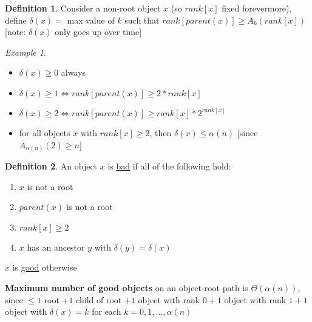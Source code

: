 \documentclass[a4paper,12pt]{article}
\theoremstyle{plain}
\theoremstyle{definition}
\newtheorem*{definition}{Definition}
\theoremstyle{remark}
\newtheorem*{example}{Example}
\begin{document}
\begin{definition}
Consider a non-root object $x$ (so $rank[x]$ fixed forevermore), define $\delta(x) =$ max value of $k$ such that $rank[parent(x)] \geq A_k(rank[x])$ [note: $\delta(x)$ only goes up over time]
\end{definition}

\begin{example}
\begin{itemize}
	\item $\delta(x) \geq 0$ always
	\item $\delta(x) \geq 1 \iff rank[parent(x)] \geq 2 * rank[x]$
	\item $\delta(x) \geq 2 \iff rank[parent(x)] \geq rank[x] * 2^{rank[x]}$
	\item for all objects $x$ with $rank[x] \geq 2$, then $\delta(x) \leq \alpha(n)$ [since $A_{\alpha(n)}(2) \geq n$]
\end{itemize}
\end{example}

\begin{definition}
An object $x$ is \underline{bad} if all of the following hold:
\begin{enumerate}
	\item $x$ is not a root
	\item $parent(x)$ is not a root
	\item $rank[x] \geq 2$
	\item $x$ has an ancestor $y$ with $\delta(y) = \delta(x)$
\end{enumerate}

$x$ is \underline{good} otherwise
\end{definition}

\textbf{Maximum number of good objects} on an object-root path is \underline{$\Theta(\alpha
(n))$}, since $\leq 1$ root $+ 1$ child of root $+ 1$ object with rank $0 + 1$ object with rank $1 + 1$ object with $\delta(x) = k$ for each $k = 0, 1, \dots, \alpha(n)$
\end{document}
